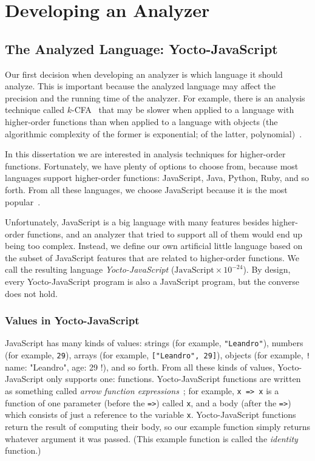\documentclass[12pt, oneside]{book}
\begin{document}
\chapter{Developing an Analyzer}


\section{The Analyzed Language: Yocto-JavaScript}
\label{the-analyzed-language-yocto-javascript}

Our first decision when developing an analyzer is which language it should analyze. This is important because the analyzed language may affect the precision and the running time of the analyzer. For example, there is an analysis technique called $k$-CFA~\cite{k-cfa} that may be slower when applied to a language with higher-order functions than when applied to a language with objects (the algorithmic complexity of the former is exponential; of the latter, polynomial)~\cite{m-cfa}.

In this dissertation we are interested in analysis techniques for higher-order functions. Fortunately, we have plenty of options to choose from, because most languages support higher-order functions: JavaScript, Java, Python, Ruby, and so forth. From all these languages, we choose JavaScript because it is the most popular~\cite{stack-overflow-developer-survey, jet-brains-developer-survey}.

Unfortunately, JavaScript is a big language with many features besides higher-order functions, and an analyzer that tried to support all of them would end up being too complex. Instead, we define our own artificial little language based on the subset of JavaScript features that are related to higher-order functions. We call the resulting language \emph{Yocto-JavaScript} ($\mathrm{JavaScript} \times 10^{-24}$). By design, every Yocto-JavaScript program is also a JavaScript program, but the converse does not hold.

\subsection{Values in Yocto-JavaScript}
\label{Values in Yocto-JavaScript}

JavaScript has many kinds of values: strings (for example, \texttt{"Leandro"}), numbers (for example, \texttt{29}), arrays (for example, \texttt{["Leandro", 29]}), objects (for example, \texttt!{ name: "Leandro", age: 29 }!), and so forth. From all these kinds of values, Yocto-JavaScript only supports one: functions. Yocto-JavaScript functions are written as something called \emph{arrow function expressions}~\cite{arrow-function-expressions}; for example, \texttt{x => x} is a function of one parameter (before the \texttt{=>}) called \texttt{x}, and a body (after the \texttt{=>}) which consists of just a reference to the variable \texttt{x}. Yocto-JavaScript functions return the result of computing their body, so our example function simply returns whatever argument it was passed. (This example function is called the \emph{identity} function.)
\end{document}
